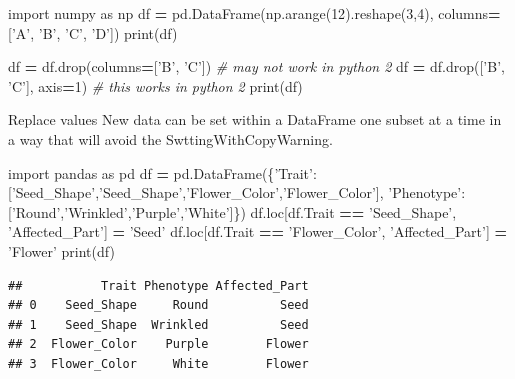 \documentclass[]{book}
\newenvironment{Shaded}{\begin{snugshade}}{\end{snugshade}}
\newcommand{\DecValTok}[1]{\textcolor[rgb]{0.00,0.00,0.81}{#1}}
\newcommand{\StringTok}[1]{\textcolor[rgb]{0.31,0.60,0.02}{#1}}
\newcommand{\ImportTok}[1]{#1}
\newcommand{\CommentTok}[1]{\textcolor[rgb]{0.56,0.35,0.01}{\textit{#1}}}
\newcommand{\OperatorTok}[1]{\textcolor[rgb]{0.81,0.36,0.00}{\textbf{#1}}}
\newcommand{\BuiltInTok}[1]{#1}
\newcommand{\NormalTok}[1]{#1}
\begin{document}
\begin{Shaded}
\begin{Highlighting}[]
\ImportTok{import}\NormalTok{ numpy }\ImportTok{as}\NormalTok{ np}
\NormalTok{df }\OperatorTok{=}\NormalTok{ pd.DataFrame(np.arange(}\DecValTok{12}\NormalTok{).reshape(}\DecValTok{3}\NormalTok{,}\DecValTok{4}\NormalTok{),}
\NormalTok{                    columns}\OperatorTok{=}\NormalTok{[}\StringTok{'A'}\NormalTok{, }\StringTok{'B'}\NormalTok{, }\StringTok{'C'}\NormalTok{, }\StringTok{'D'}\NormalTok{])}
\BuiltInTok{print}\NormalTok{(df)}

\NormalTok{df }\OperatorTok{=}\NormalTok{ df.drop(columns}\OperatorTok{=}\NormalTok{[}\StringTok{'B'}\NormalTok{, }\StringTok{'C'}\NormalTok{]) }\CommentTok{# may not work in python 2}
\NormalTok{df }\OperatorTok{=}\NormalTok{ df.drop([}\StringTok{'B'}\NormalTok{, }\StringTok{'C'}\NormalTok{], axis}\OperatorTok{=}\DecValTok{1}\NormalTok{) }\CommentTok{# this works in python 2}
\BuiltInTok{print}\NormalTok{(df)}
\end{Highlighting}
\end{Shaded}

Replace values New data can be set within a DataFrame one subset at a
time in a way that will avoid the SwttingWithCopyWarning.

\begin{Shaded}
\begin{Highlighting}[]
\ImportTok{import}\NormalTok{ pandas }\ImportTok{as}\NormalTok{ pd}
\NormalTok{df }\OperatorTok{=}\NormalTok{ pd.DataFrame(\{}\StringTok{'Trait'}\NormalTok{:[}\StringTok{'Seed_Shape'}\NormalTok{,}\StringTok{'Seed_Shape'}\NormalTok{,}\StringTok{'Flower_Color'}\NormalTok{,}\StringTok{'Flower_Color'}\NormalTok{],}
                    \StringTok{'Phenotype'}\NormalTok{:[}\StringTok{'Round'}\NormalTok{,}\StringTok{'Wrinkled'}\NormalTok{,}\StringTok{'Purple'}\NormalTok{,}\StringTok{'White'}\NormalTok{]\})}
\NormalTok{df.loc[df.Trait }\OperatorTok{==} \StringTok{'Seed_Shape'}\NormalTok{, }\StringTok{'Affected_Part'}\NormalTok{] }\OperatorTok{=} \StringTok{'Seed'}
\NormalTok{df.loc[df.Trait }\OperatorTok{==} \StringTok{'Flower_Color'}\NormalTok{, }\StringTok{'Affected_Part'}\NormalTok{] }\OperatorTok{=} \StringTok{'Flower'}
\BuiltInTok{print}\NormalTok{(df)}
\end{Highlighting}
\end{Shaded}

\begin{verbatim}
##           Trait Phenotype Affected_Part
## 0    Seed_Shape     Round          Seed
## 1    Seed_Shape  Wrinkled          Seed
## 2  Flower_Color    Purple        Flower
## 3  Flower_Color     White        Flower
\end{verbatim}
\end{document}
